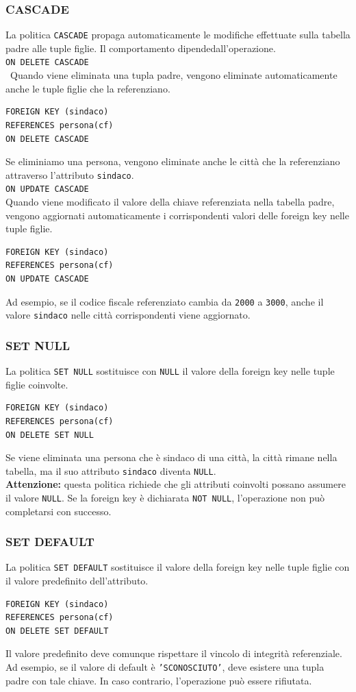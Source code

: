 \subsubsection{CASCADE}
La politica \texttt{CASCADE} propaga
automaticamente le modifiche effettuate
sulla tabella padre alle tuple figlie.
Il comportamento dipendedall'operazione.\medskip\\
\texttt{ON DELETE CASCADE}\\\
Quando viene eliminata una tupla padre,
vengono eliminate automaticamente anche
le tuple figlie che la referenziano.
\begin{verbatim}
FOREIGN KEY (sindaco)
REFERENCES persona(cf)
ON DELETE CASCADE
\end{verbatim}
Se eliminiamo una persona, vengono
eliminate anche le città che la
referenziano attraverso l'attributo
\texttt{sindaco}.\medskip\\
\texttt{ON UPDATE CASCADE}\\
Quando viene modificato il valore
della chiave referenziata nella
tabella padre, vengono aggiornati
automaticamente i corrispondenti
valori delle foreign key nelle
tuple figlie.
\begin{verbatim}
FOREIGN KEY (sindaco)
REFERENCES persona(cf)
ON UPDATE CASCADE
\end{verbatim}
Ad esempio, se il codice fiscale
referenziato cambia da \texttt{2000}
a \texttt{3000}, anche il valore
\texttt{sindaco} nelle città
corrispondenti viene aggiornato.
\subsubsection{SET NULL}
La politica \texttt{SET NULL}
sostituisce con \texttt{NULL}
il valore della foreign key nelle
tuple figlie coinvolte.
\begin{verbatim}
FOREIGN KEY (sindaco)
REFERENCES persona(cf)
ON DELETE SET NULL
\end{verbatim}
Se viene eliminata una persona
che è sindaco di una città,
la città rimane nella tabella,
ma il suo attributo
\texttt{sindaco} diventa \texttt{NULL}.\\
\textbf{Attenzione:} questa politica
richiede che gli attributi coinvolti
possano assumere il valore \texttt{NULL}.
Se la foreign key è dichiarata
\texttt{NOT NULL}, l'operazione
non può completarsi con successo.
\subsubsection{SET DEFAULT}
La politica \texttt{SET DEFAULT}
sostituisce il valore della foreign key
nelle tuple figlie con il valore
predefinito dell'attributo.
\begin{verbatim}
FOREIGN KEY (sindaco)
REFERENCES persona(cf)
ON DELETE SET DEFAULT
\end{verbatim}
Il valore predefinito deve comunque
rispettare il vincolo di integrità
referenziale.
Ad esempio, se il valore di default
è \texttt{'SCONOSCIUTO'}, deve esistere
una tupla padre con tale chiave.
In caso contrario, l'operazione
può essere rifiutata.
